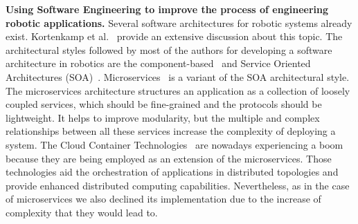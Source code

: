 \textbf{Using Software Engineering to improve the process of engineering robotic applications.}
Several software architectures for robotic systems already exist. 
Kortenkamp et al.~\cite{Kortenkamp2008} provide an extensive discussion about this topic. 
The architectural styles followed by most of the authors for developing a software architecture in robotics are the component-based~\cite{Bruyninckx2013,braberman} and Service Oriented Architectures (SOA)~\cite{Fluckiger2014}.
Microservices~\cite{Newman2015} is a variant of the SOA architectural style. 
The microservices architecture structures an application as a collection of loosely coupled services, which should be fine-grained and the protocols should be lightweight. 
It helps to improve modularity, but the multiple and complex relationships between all these services %
increase the complexity of deploying a system. %
The Cloud Container Technologies~\cite{Pahl2017} are nowadays experiencing a boom because they are being employed as an extension of the microservices. 
Those technologies aid the orchestration of applications in distributed topologies and provide enhanced distributed computing capabilities. %
Nevertheless, as in the case of microservices we also declined its implementation due to the increase of complexity that they would lead to.

